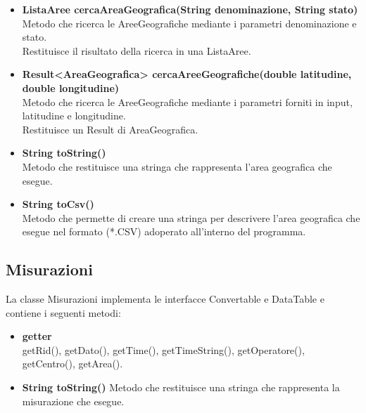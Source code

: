 \documentclass[a4paper, 12pt]{scrreprt}
\begin{document}
\begin{itemize}
				\item \textbf{ListaAree cercaAreaGeografica(String denominazione, String stato)}
				\\Metodo che ricerca le AreeGeografiche mediante i parametri denominazione e stato.
				\\Restituisce il risultato della ricerca in una ListaAree.
				
				\item \textbf{Result<AreaGeografica> cercaAreeGeografiche(double latitudine, double longitudine)}
				\\Metodo che ricerca le AreeGeografiche mediante i parametri forniti in input, latitudine e longitudine.
				\\Restituisce un Result di AreaGeografica.
				
				\item \textbf{String toString()}
				\\Metodo che restituisce una stringa che rappresenta l'area geografica che esegue.
				
				\item \textbf{String toCsv()}
				\\Metodo che permette di creare una stringa per descrivere l'area geografica che esegue nel formato (*.CSV) adoperato all'interno del programma.
			\end{itemize}

			\subsection{Misurazioni}
			La classe Misurazioni implementa le interfacce Convertable e DataTable e contiene i seguenti metodi:\\
			\begin{itemize}
				\item \textbf{getter}
				\\getRid(), getDato(), getTime(), getTimeString(), getOperatore(), getCentro(), getArea().
				
				\item \textbf{String toString()}
				Metodo che restituisce una stringa che rappresenta la misurazione che esegue.
			\end{itemize}
\end{document}
